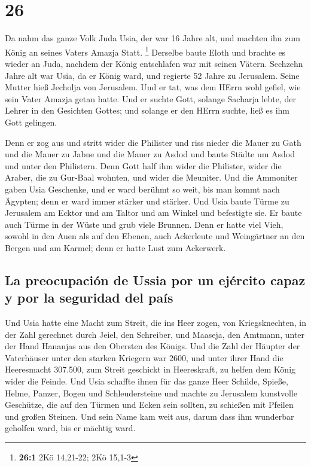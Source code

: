 \hypertarget{section-25}{%
\section{26}\label{section-25}}

 Da nahm das ganze Volk Juda Usia, der war 16 Jahre alt,
und machten ihn zum König an seines Vaters Amazja Statt. \footnote{\textbf{26:1}
  2Kö 14,21-22; 2Kö 15,1-3}  Derselbe baute Eloth und
brachte es wieder an Juda, nachdem der König entschlafen war mit seinen
Vätern.  Sechzehn Jahre alt war Usia, da er König ward,
und regierte 52 Jahre zu Jerusalem. Seine Mutter hieß Jecholja von
Jerusalem.  Und er tat, was dem HErrn wohl gefiel, wie
sein Vater Amazja getan hatte.  Und er suchte Gott,
solange Sacharja lebte, der Lehrer in den Gesichten Gottes; und solange
er den HErrn suchte, ließ es ihm Gott gelingen.

 Denn er zog aus und stritt wider die Philister und riss
nieder die Mauer zu Gath und die Mauer zu Jabne und die Mauer zu Asdod
und baute Städte um Asdod und unter den Philistern.  Denn
Gott half ihm wider die Philister, wider die Araber, die zu Gur-Baal
wohnten, und wider die Meuniter.  Und die Ammoniter gaben
Usia Geschenke, und er ward berühmt so weit, bis man kommt nach Ägypten;
denn er ward immer stärker und stärker.  Und Usia baute
Türme zu Jerusalem am Ecktor und am Taltor und am Winkel und befestigte
sie.  Er baute auch Türme in der Wüste und grub viele
Brunnen. Denn er hatte viel Vieh, sowohl in den Auen als auf den Ebenen,
auch Ackerleute und Weingärtner an den Bergen und am Karmel; denn er
hatte Lust zum Ackerwerk.

\hypertarget{la-preocupaciuxf3n-de-ussia-por-un-ejuxe9rcito-capaz-y-por-la-seguridad-del-pauxeds}{%
\subsection{La preocupación de Ussia por un ejército capaz y por la
seguridad del
país}\label{la-preocupaciuxf3n-de-ussia-por-un-ejuxe9rcito-capaz-y-por-la-seguridad-del-pauxeds}}

 Und Usia hatte eine Macht zum Streit, die ins Heer
zogen, von Kriegsknechten, in der Zahl gerechnet durch Jeiel, den
Schreiber, und Maaseja, den Amtmann, unter der Hand Hananjas aus den
Obersten des Königs.  Und die Zahl der Häupter der
Vaterhäuser unter den starken Kriegern war 2600,  und
unter ihrer Hand die Heeresmacht 307.500, zum Streit geschickt in
Heereskraft, zu helfen dem König wider die Feinde.  Und
Usia schaffte ihnen für das ganze Heer Schilde, Spieße, Helme, Panzer,
Bogen und Schleudersteine  und machte zu Jerusalem
kunstvolle Geschütze, die auf den Türmen und Ecken sein sollten, zu
schießen mit Pfeilen und großen Steinen. Und sein Name kam weit aus,
darum dass ihm wunderbar geholfen ward, bis er mächtig ward.

